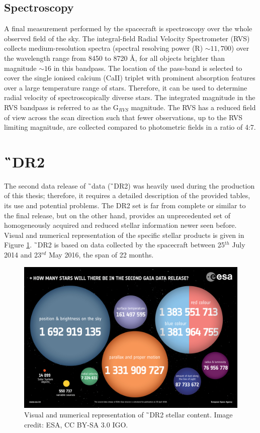 \subsection{Spectroscopy}
A final measurement performed by the spacecraft is spectroscopy over the whole observed field of the sky. The integral-field Radial Velocity Spectrometer (RVS) \cite{2018A&A...616A...5C} collects medium-resolution spectra (spectral resolving power (R) $\sim11,700$) over the wavelength range from 8450 to 8720 \AA, for all objects brighter than magnitude $\sim16$ in this bandpass. The location of the pass-band is selected to cover the single ionised calcium (CaII) triplet with prominent absorption features over a large temperature range of stars. Therefore, it can be used to determine radial velocity of spectroscopically diverse stars. The integrated magnitude in the RVS bandpass is referred to as the G$_{RVS}$ magnitude. The RVS has a reduced field of view across the scan direction such that fewer observations, up to the RVS limiting magnitude, are collected compared to photometric fields in a ratio of 4:7.

\section{\G\ DR2}
\label{sec:gaia_dr2_data}
The second data release of \G\ data (\G\ DR2) was heavily used during the production of this thesis; therefore, it requires a detailed description of the provided tables, its use and potential problems. The DR2 set is far from complete or similar to the final release, but on the other hand, provides an unprecedented set of homogeneously acquired and reduced stellar information newer seen before. Visual and numerical representation of the specific stellar products is given in Figure \ref{fig:gaia_drs}. \G\ DR2 is based on data collected by the spacecraft between 25$^{th}$ July 2014 and 23$^{rd}$ May 2016, the span of 22 months.

\begin{figure}
	\centering
	\includegraphics[width=\columnwidth]{1567214817936-Gaia_DR2_numbers_1280.jpg}
	\caption{Visual and numerical representation of \G\ DR2 stellar content. Image credit: ESA, CC BY-SA 3.0 IGO.}
	\label{fig:gaia_drs}
\end{figure}

